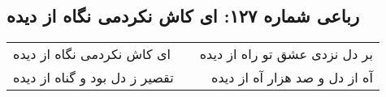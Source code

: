 \begin{center}
\section*{رباعی شماره ۱۲۷: ای کاش نکردمی نگاه از دیده}
\label{sec:127}
\begin{longtable}{l p{0.5cm} r}
ای کاش نکردمی نگاه از دیده
&&
بر دل نزدی عشق تو راه از دیده
\\
تقصیر ز دل بود و گناه از دیده
&&
آه از دل و صد هزار آه از دیده
\\
\end{longtable}
\end{center}
